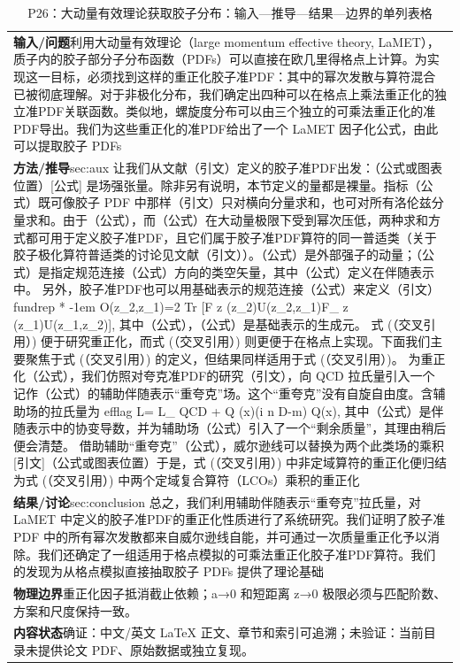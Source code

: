 \documentclass[UTF8,11pt,oneside]{ctexbook}
\begin{document}
\begin{table}[htbp]
  \centering
  \caption*{P26：大动量有效理论获取胶子分布：输入—推导—结果—边界的单列表格}
  \small
  \begin{tabular}{@{}p{}@{}}
    \toprule
    \textbf{输入/问题}\quad 利用大动量有效理论（large momentum effective theory, LaMET），质子内的胶子部分子分布函数（PDFs）可以直接在欧几里得格点上计算。为实现这一目标，必须找到这样的重正化胶子准PDF：其中的幂次发散与算符混合已被彻底理解。对于非极化分布，我们确定出四种可以在格点上乘法重正化的独立准PDF关联函数。类似地，螺旋度分布可以由三个独立的可乘法重正化的准PDF导出。我们为这些重正化的准PDF给出了一个 LaMET 因子化公式，由此可以提取胶子 PDFs \\
    \textbf{方法/推导}\quad sec:aux 让我们从文献（引文）定义的胶子准PDF出发：（公式或图表位置）[公式] 是场强张量。除非另有说明，本节定义的量都是裸量。指标（公式）既可像胶子 PDF 中那样（引文）只对横向分量求和，也可对所有洛伦兹分量求和。由于（公式），而（公式）在大动量极限下受到幂次压低，两种求和方式都可用于定义胶子准PDF，且它们属于胶子准PDF算符的同一普适类（关于胶子极化算符普适类的讨论见文献（引文））。（公式）是外部强子的动量；（公式）是指定规范连接（公式）方向的类空矢量，其中（公式）定义在伴随表示中。 另外，胶子准PDF也可以用基础表示的规范连接（公式）来定义（引文）fundrep * -1em O(z\_2,z\_1)=2 Tr [F z (z\_2)U(z\_2,z\_1)F\_ z (z\_1)U(z\_1,z\_2)], 其中（公式），（公式）是基础表示的生成元。 式 (（交叉引用）) 便于研究重正化，而式 (（交叉引用）) 则更便于在格点上实现。下面我们主要聚焦于式 (（交叉引用）) 的定义，但结果同样适用于式 (（交叉引用）)。 为重正化（公式），我们仿照对夸克准PDF的研究（引文），向 QCD 拉氏量引入一个记作（公式）的辅助伴随表示“重夸克”场。这个“重夸克”没有自旋自由度。含辅助场的拉氏量为 efflag L= L\_ QCD + Q (x)(i n D-m) Q(x), 其中（公式）是伴随表示中的协变导数，并为辅助场（公式）引入了一个“剩余质量”，其理由稍后便会清楚。 借助辅助“重夸克”（公式），威尔逊线可以替换为两个此类场的乘积 [引文]（公式或图表位置）于是，式 (（交叉引用）) 中非定域算符的重正化便归结为式 (（交叉引用）) 中两个定域复合算符（LCOs）乘积的重正化 \\
    \textbf{结果/讨论}\quad sec:conclusion 总之，我们利用辅助伴随表示“重夸克”拉氏量，对 LaMET 中定义的胶子准PDF的重正化性质进行了系统研究。我们证明了胶子准 PDF 中的所有幂次发散都来自威尔逊线自能，并可通过一次质量重正化予以消除。我们还确定了一组适用于格点模拟的可乘法重正化胶子准PDF算符。我们的发现为从格点模拟直接抽取胶子 PDFs 提供了理论基础 \\
    \textbf{物理边界}\quad 重正化因子抵消截止依赖；a→0 和短距离 z→0 极限必须与匹配阶数、方案和尺度保持一致。 \\
    \textbf{内容状态}\quad 确证：中文/英文 LaTeX 正文、章节和索引可追溯；未验证：当前目录未提供论文 PDF、原始数据或独立复现。 \\
    \bottomrule
  \end{tabular}
\end{table}
\end{document}
